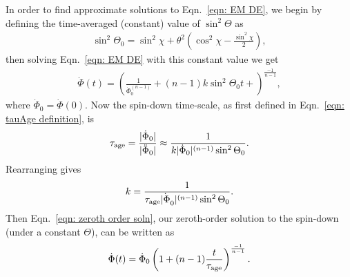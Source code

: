 \documentclass[../full_thesis/full_thesis.tex]{subfiles}
\begin{document}
In order to find approximate solutions to Eqn.~\eqref{eqn: EM DE}, we begin by
defining the time-averaged (constant) value of $\sin^{2}\Theta$ as
\begin{align}
\sin^{2}\Theta_0 =
\sin^{2}\chi + \theta^{2}\left(\cos^{2}\chi - \frac{\sin^{2}\chi}{2}\right),
\label{eqn: sin2Theta0}
\end{align}
then solving Eqn.~\eqref{eqn: EM DE} with this constant value we get
\begin{align}
\dot{\Phi}(t) = \left(\frac{1}{\dot{\Phi}_0^{(n-1)}}
                      + (n-1)k\sin^{2}\Theta_0 t + \right)^{\frac{-1}{n-1}},
\label{eqn: zeroth order soln}
\end{align}
where $\dot{\Phi}_0 = \dot{\Phi}(0)$. Now the spin-down time-scale,
as first defined in Eqn.~\eqref{eqn: tauAge definition}, is
\begin{align}
\tau_{\mathrm{age}} = \frac{|\dot{\Phi}_0|}{|\ddot{\Phi}_0|}
\approx \frac{1}{k|\dot{\Phi}_0|^{(n-1)} \sin^{2}\Theta_0}.
\end{align}
Rearranging gives
\begin{align}
k = \frac{1}{\tau_{\mathrm{age}} \dot{|\Phi}_0|^{(n-1)} \sin^{2}\Theta_0}.
\end{align}
Then Eqn.~\eqref{eqn: zeroth order soln}, our zeroth-order solution to the
spin-down (under a constant $\Theta$), can be written as
\begin{align}
\dot{\Phi}(t) = \dot{\Phi}_0\left(1 + (n-1)\frac{t}{\tau_{\mathrm{age}}}\right)^{\frac{-1}{n-1}}.
\label{eqn: zeroth order soln complete}
\end{align}
\end{document}
